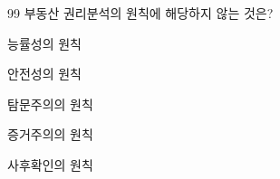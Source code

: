 \begin{question}{99}
부동산 권리분석의 원칙에 해당하지 않는 것은?
\begin{choices}
  \item 능률성의 원칙
  \item 안전성의 원칙
  \item 탐문주의의 원칙
  \item 증거주의의 원칙
  \item 사후확인의 원칙
\end{choices}
\end{question}
